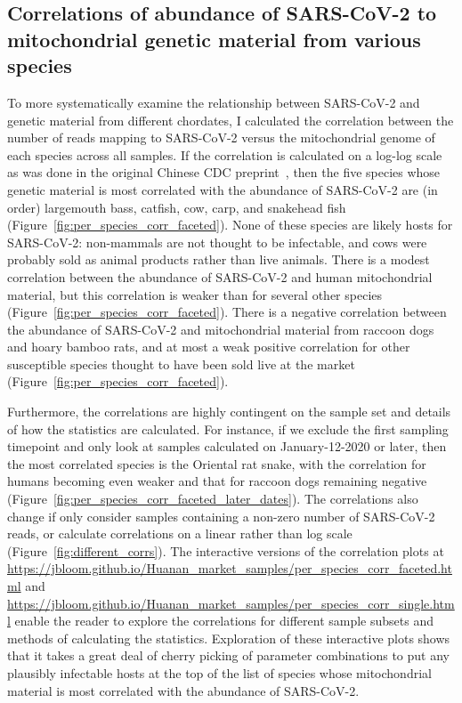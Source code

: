 \documentclass[9pt,twocolumn,twoside]{gsajnl_modified}
\begin{document}
\subsection{Correlations of abundance of SARS-CoV-2 to mitochondrial genetic material from various species}
To more systematically examine the relationship between SARS-CoV-2 and genetic material from different chordates, I calculated the correlation between the number of reads mapping to SARS-CoV-2 versus the mitochondrial genome of each species across all samples.
If the correlation is calculated on a log-log scale as was done in the original Chinese CDC preprint~\citep{liu2022surveillance}, then the five species whose genetic material is most correlated with the abundance of SARS-CoV-2 are (in order) largemouth bass, catfish, cow, carp, and snakehead fish (Figure~\ref{fig:per_species_corr_faceted}).
None of these species are likely hosts for SARS-CoV-2: non-mammals are not thought to be infectable, and cows were probably sold as animal products rather than live animals.
There is a modest correlation between the abundance of SARS-CoV-2 and human mitochondrial material, but this correlation is weaker than for several other species (Figure~\ref{fig:per_species_corr_faceted}).
There is a negative correlation between the abundance of SARS-CoV-2 and mitochondrial material from raccoon dogs and hoary bamboo rats, and at most a weak positive correlation for other susceptible species thought to have been sold live at the market (Figure~\ref{fig:per_species_corr_faceted}).

Furthermore, the correlations are highly contingent on the sample set and details of how the statistics are calculated.
For instance, if we exclude the first sampling timepoint and only look at samples calculated on January-12-2020 or later, then the most correlated species is the Oriental rat snake, with the correlation for humans becoming even weaker and that for raccoon dogs remaining negative (Figure~\ref{fig:per_species_corr_faceted_later_dates}).
The correlations also change if only consider samples containing a non-zero number of SARS-CoV-2 reads, or calculate correlations on a linear rather than log scale (Figure~\ref{fig:different_corrs}).
The interactive versions of the correlation plots at \url{https://jbloom.github.io/Huanan_market_samples/per_species_corr_faceted.html} and \url{https://jbloom.github.io/Huanan_market_samples/per_species_corr_single.html} enable the reader to explore the correlations for different sample subsets and methods of calculating the statistics.
Exploration of these interactive plots shows that it takes a great deal of cherry picking of parameter combinations to put any plausibly infectable hosts at the top of the list of species whose mitochondrial material is most correlated with the abundance of SARS-CoV-2.
\end{document}
